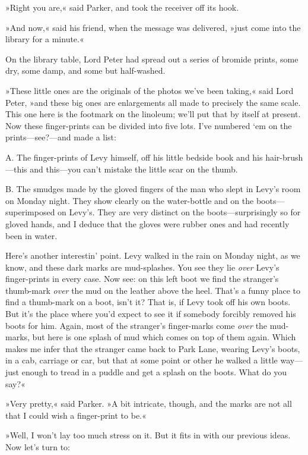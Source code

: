 »Right you are,« said Parker, and took the receiver off its hook.

»And now,« said his friend, when the message was delivered, »just come into the library for a minute.«

On the library table, Lord Peter had spread out a series of bromide prints, some dry, some damp, and some but half-washed.

»These little ones are the originals of the photos we've been taking,« said Lord Peter, »and these big ones are enlargements all made to precisely the same scale. This one here is the footmark on the linoleum; we'll put that by itself at present. Now these finger-prints can be divided into five lots. I've numbered `em on the prints—see?---and made a list:

\textsc{A.} The finger-prints of Levy himself, off his little bedside book and his hair-brush—this and this—you can't mistake the little scar on the thumb.

\textsc{B.} The smudges made by the gloved fingers of the man who slept in Levy's room on Monday night. They show clearly on the water-bottle and on the boots—superimposed on Levy's. They are very distinct on the boots—surprisingly so for gloved hands, and I deduce that the gloves were rubber ones and had recently been in water.

Here's another interestin' point. Levy walked in the rain on Monday night, as we know, and these dark marks are mud-splashes. You see they lie \textit{over} Levy's finger-prints in every case. Now see: on this left boot we find the stranger's thumb-mark \textit{over} the mud on the leather above the heel. That's a funny place to find a thumb-mark on a boot, isn't it? That is, if Levy took off his own boots. But it's the place where you'd expect to see it if somebody forcibly removed his boots for him. Again, most of the stranger's finger-marks come \textit{over} the mud-marks, but here is one splash of mud which comes on top of them again. Which makes me infer that the stranger came back to Park Lane, wearing Levy's boots, in a cab, carriage or car, but that at some point or other he walked a little way—just enough to tread in a puddle and get a splash on the boots. What do you say?«

»Very pretty,« said Parker. »A bit intricate, though, and the marks are not all that I could wish a finger-print to be.«

»Well, I won't lay too much stress on it. But it fits in with our previous ideas. Now let's turn to:

